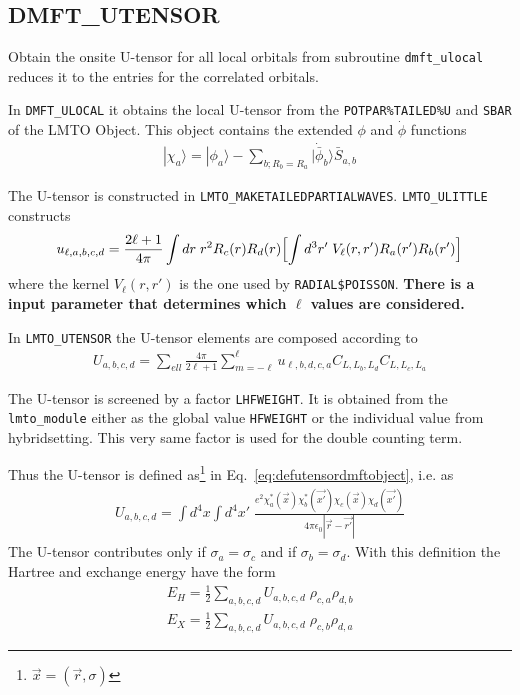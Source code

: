 \documentclass[11pt,a4paper]{report}
\begin{document}
\subsection{DMFT\_UTENSOR}
\label{sec:routinedmftutensor}
Obtain the onsite U-tensor for all local orbitals from
subroutine \verb|dmft_ulocal| reduces it to the entries for the
correlated orbitals.

In \verb|DMFT_ULOCAL| it obtains the local U-tensor from the
\verb|POTPAR%TAILED%U| and \verb|SBAR| of the LMTO Object. This object
contains the extended $\phi$ and $\dot{\phi}$ functions
\begin{eqnarray}
|\chi_a\rangle=|\phi_a\rangle-
\sum_{b; R_b=R_a}|\dot{\bar{\phi}}_b\rangle \bar{S}_{a,b}
\end{eqnarray}


The U-tensor is constructed in \verb|LMTO_MAKETAILEDPARTIALWAVES|.
\verb|LMTO_ULITTLE| constructs
\begin{eqnarray}
u_{\ell,a,b,c,d}
=\frac{2\ell+1}{4\pi}
\int dr\; r^2R_c(r)R_d(r)\Bigl[\int d^3r'\;V_\ell(r,r')R_a(r')R_b(r')\Bigr]
\end{eqnarray}
where the kernel $V_\ell(r,r')$ is the one used by \verb|RADIAL$POISSON|.
\textbf{There is a input parameter that determines which $\ell$ values are
considered.}

In \verb|LMTO_UTENSOR| the U-tensor elements are composed according to
\begin{eqnarray}
U_{a,b,c,d}=\sum_{ell}\frac{4\pi}{2\ell+1}\sum_{m=-\ell}^\ell
u_{\ell,b,d,c,a} C_{L,L_b,L_d}C_{L,L_c,L_a}
\end{eqnarray}

The U-tensor is screened by a factor \verb|LHFWEIGHT|. It is obtained
from the \verb|lmto_module| either as the global value \verb|HFWEIGHT|
or the individual value from hybridsetting. This very same factor is
used for the double counting term.

Thus the U-tensor is defined as\footnote{$\vec{x}=(\vec{r},\sigma)$}
in Eq.~\ref{eq:defutensordmftobject}, i.e. as
\begin{eqnarray}
U_{a,b,c,d}=\int d^4x\int d^4x'\;
\frac{e^2\chi^*_a(\vec{x})\chi^*_b(\vec{x'})\chi_c(\vec{x})\chi_d(\vec{x'})}
{4\pi\epsilon_0|\vec{r}-\vec{r'}|}
\end{eqnarray}
The U-tensor contributes only if $\sigma_a=\sigma_c$ and if
$\sigma_b=\sigma_d$.
With this definition the Hartree and exchange  energy have the form
\begin{eqnarray}
E_H=\frac{1}{2}\sum_{a,b,c,d}U_{a,b,c,d}\;\rho_{c,a}\rho_{d,b}
\nonumber\\
E_X=\frac{1}{2}\sum_{a,b,c,d}U_{a,b,c,d}\;\rho_{c,b}\rho_{d,a}
\end{eqnarray}
\end{document}
